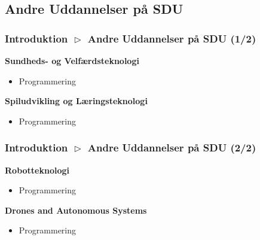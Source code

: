 \subsection{Andre Uddannelser på SDU}
\begin{frame}[fragile]
  \frametitle{Introduktion $\vartriangleright$ Andre Uddannelser på SDU (1/2)}
  \vspace{7mm}
  \textbf{Sundheds- og Velfærdsteknologi}
  \begin{itemize}
     BSc og MSc
     Anatomi, Bevægelse, Fysiologi, Medicinsk udstyr
    \item Programmering
  \end{itemize}
  
  \pause
  \vspace{9mm}
  \textbf{Spiludvikling og Læringsteknologi}
  \begin{itemize}
     BSc og MSc
     Læringsteori, Spilprogrammering, Virtual \& Augmented Reality, Robotik, Historiefortælling
    \item Programmering
  \end{itemize}
\end{frame}
\begin{frame}[fragile]
  \frametitle{Introduktion $\vartriangleright$ Andre Uddannelser på SDU (2/2)}
  \vspace{7mm}
  \textbf{Robotteknologi}
  \begin{itemize}
     BSc (både diplom og civil) og MSc
     Mekanik, Elektronik, Kinematik, Radio
    \item Programmering
  \end{itemize}
  
  \pause
  \vspace{9mm}
  \textbf{Drones and Autonomous Systems}
  \begin{itemize}
     MSc (overbygning til robotteknologi)
     Autonome systemer
    \item Programmering
  \end{itemize}
\end{frame}

